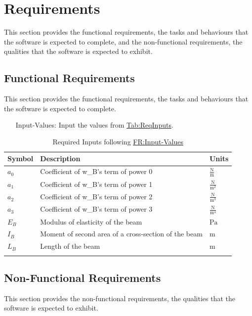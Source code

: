 \documentclass[12pt]{article}
\begin{document}
\section{Requirements}
\label{Sec:Requirements}
This section provides the functional requirements, the tasks and behaviours that the software is expected to complete, and the non-functional requirements, the qualities that the software is expected to exhibit.

\subsection{Functional Requirements}
\label{Sec:FRs}
This section provides the functional requirements, the tasks and behaviours that the software is expected to complete.

\begin{itemize}
\item[Input-Values:\phantomsection\label{inputValues}]{Input the values from \hyperref[Table:ReqInputs]{Tab:ReqInputs}.}
\end{itemize}
\begin{longtabu}{l X[l] l}
\toprule
\textbf{Symbol} & \textbf{Description} & \textbf{Units}
\\
\midrule
\endhead
${a_{\text{0}}}$ & Coefficient of w\_B's term of power 0 & $\frac{\text{N}}{\text{m}}$
\\
${a_{\text{1}}}$ & Coefficient of w\_B's term of power 1 & $\frac{\text{N}}{\text{m}^{2}}$
\\
${a_{\text{2}}}$ & Coefficient of w\_B's term of power 2 & $\frac{\text{N}}{\text{m}^{3}}$
\\
${a_{\text{3}}}$ & Coefficient of w\_B's term of power 3 & $\frac{\text{N}}{\text{m}^{4}}$
\\
${E_{B}}$ & Modulus of elasticity of the beam & ${\text{Pa}}$
\\
${I_{B}}$ & Moment of second area of a cross-section of the beam & ${\text{m}}$
\\
${L_{B}}$ & Length of the beam & ${\text{m}}$
\\
\bottomrule
\caption{Required Inputs following \hyperref[inputValues]{FR:Input-Values}}
\label{Table:ReqInputs}
\end{longtabu}
\subsection{Non-Functional Requirements}
\label{Sec:NFRs}
This section provides the non-functional requirements, the qualities that the software is expected to exhibit.
\end{document}
